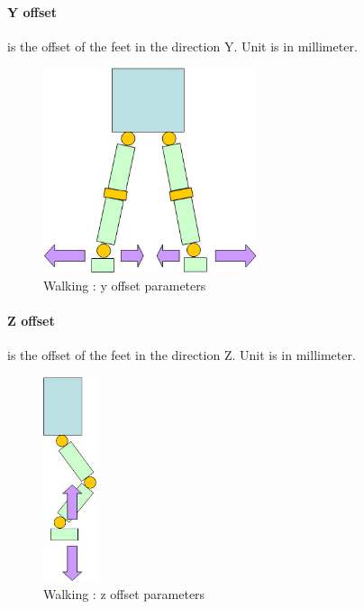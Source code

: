 \documentclass[a4paper, 12pt]{article}  		%
\begin{document}
\paragraph*{Y offset}
is the offset of the feet in the direction Y. Unit is in millimeter.
\begin{figure}[H]
\begin{center}
\includegraphics[height=6cm]{y_offset.jpg}
\caption{Walking : y offset parameters}
\label{y_offset}
\end{center}
\end{figure}

\newpage
\paragraph*{Z offset}
is the offset of the feet in the direction Z. Unit is in millimeter.
\begin{figure}[H]
\begin{center}
\includegraphics[height=6cm]{z_offset.jpg}
\caption{Walking : z offset parameters}
\label{z_offset}
\end{center}
\end{figure}
\end{document}
